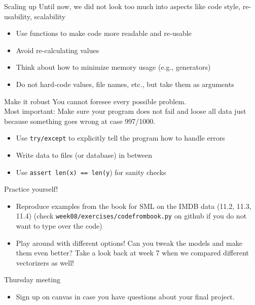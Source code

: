 \documentclass[handout]{beamer}
\begin{document}
\begin{frame}{Scaling up}
Until now, we did not look too much into aspects like code style, re-usability, scalability
\begin{itemize}
\item Use functions to make code more readable and re-usable
\item Avoid re-calculating values
\item Think about how to minimize memory usage (e.g., generators)
\item Do not hard-code values, file names, etc., but take them as arguments
\end{itemize}	
\end{frame}




\begin{frame}{Make it robust}
You cannot foresee every possible problem.\\
Most important: Make sure your program does not fail and loose all data just because something goes wrong at case 997/1000.
\begin{itemize}
\item Use \texttt{try/except} to explicitly tell the program how to handle errors
\item Write data to files (or database) in between
\item Use \texttt{assert len(x) == len(y}) for sanity checks
\end{itemize}	
\end{frame}



\begin{frame}{Practice yourself!}
\begin{itemize}
	\item Reproduce examples from the book for SML on the IMDB data (11.2, 11.3, 11.4) (check \texttt{week08/exercises/codefrombook.py} on github if you do not want to type over the code)
	\item Play around with different options! Can you tweak the models and make them even better? Take a look back at week 7 when we compared different vectorizers as well!
\end{itemize}
\end{frame}


\begin{frame}{Thursday meeting}
\begin{itemize}
	\item Sign up on canvas in case you have questions about your final project. 
\end{itemize}
\end{frame}

\begin{frame}
	\printbibliography
\end{frame}
\end{document}
